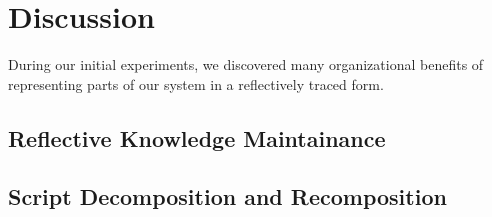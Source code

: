 \chapter{Discussion}\label{ch:discussion}

During our initial experiments, we discovered many organizational
benefits of representing parts of our system in a reflectively traced
form.

\section{Reflective Knowledge Maintainance}



\section{Script Decomposition and Recomposition}

